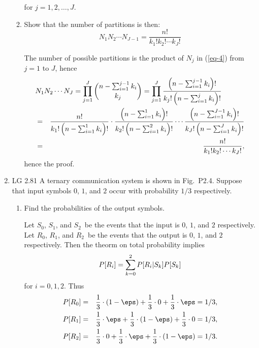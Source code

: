 \begin{enumerate}
\begin{enumerate}
\begin{solution}
		for $j = 1,2, \ldots, J$.
		\end{solution}

		\item Show that the number of partitions is then:
		\[
			N_1N_2\cdots N_{J-1} = \frac{n!}{k_1!k_2!\cdots k_J!}
		\]
		\begin{solution}
		The number of possible partitions is the product of $N_j$ in (\ref{eq-4})
		from $j=1$ to $J$,
		hence
		\begin{eqnarray*}
			\lefteqn{
			N_1 N_2 \cdots N_J
			= \prod_{j=1}^J { n - \sumto{i}{1}{j-1} k_i \choose k_j }
			= \prod_{j=1}^J
			\frac{ \left( n - \sumto{i}{1}{j-1} k_i\right)!  }
			{ k_j!  \left( n - \sumto{i}{1}{j} k_i\right)!  }
			}
			\\&=&
			\frac{n!} { k_1!  \left( n - \sumto{i}{1}{1} k_i\right)!  }
			\cdot
			\frac{ \left( n - \sumto{i}{1}{1} k_i\right)!  }
			{ k_2!  \left( n - \sumto{i}{1}{2} k_i\right)!  }
			\cdots
			\frac{ \left( n - \sumto{i}{1}{J-1} k_i\right)!  }
			{ k_J!  \left( n - \sumto{i}{1}{J} k_i\right)!  }
			\\&=& \frac{n!}{k_1!k_2!\cdots k_J!},
		\end{eqnarray*}
		hence the proof.
		\end{solution}
	\end{enumerate}
	\fi

	\newcommand{\szero}{\ensuremath{S_0}}
	\newcommand{\sone}{\ensuremath{S_1}}
	\newcommand{\stwo}{\ensuremath{S_2}}
	\newcommand{\skei}{\ensuremath{S_k}}

	\newcommand{\rzero}{\ensuremath{R_0}}
	\newcommand{\rone}{\ensuremath{R_1}}
	\newcommand{\rtwo}{\ensuremath{R_2}}
	\newcommand{\reye}{\ensuremath{R_i}}

	\item LG 2.81
	\ifdefined\sol
	A ternary communication system is shown in Fig.~P2.4.
	Suppose that input symbols $0$, $1$, and $2$
	occur with probability $1/3$ respectively.
	\begin{enumerate}
		\item Find the probabilities of the output symbols.
		\begin{solution}
			Let \szero, \sone, and \stwo\
			be the events that the input is $0$, $1$, and $2$
			respectively.
			Let \rzero, \rone, and \rtwo\
			be the events that the output is $0$, $1$, and $2$
			respectively.
			Then the theorm on total probability implies
			\[
				\pr{\reye} = \sum_{k=0}^2 \cpr{\reye}{\skei} \pr{\skei}
			\]
			for $i=0,1,2$.
			Thus
			\begin{eqnarray*}
				\pr{\rzero} &=&
				\onethird \cdot (1-\eps) + \onethird \cdot 0 + \onethird \cdot \eps =1/3,
				\\\pr{\rone} &=&
				\onethird \cdot \eps + \onethird \cdot (1-\eps) + \onethird \cdot 0 =1/3,
				\\\pr{\rtwo} &=&
				\onethird \cdot 0 + \onethird \cdot \eps + \onethird \cdot (1-\eps) =1/3.
			\end{eqnarray*}
		\end{solution}


\end{enumerate}
\end{enumerate}

